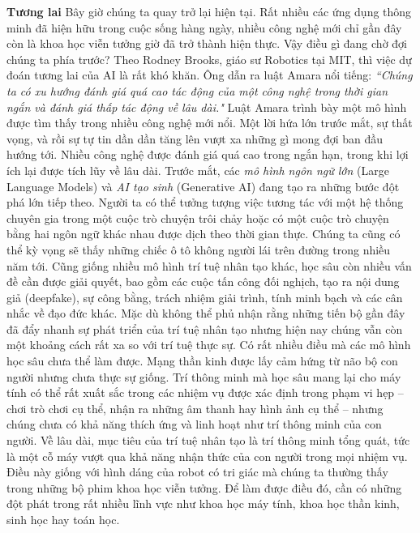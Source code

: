 \begin{multicols}{2}
	\vskip 0.1cm
	\textbf{\color{timhieukhoahoc}Tương lai}
	\vskip 0.1cm
	Bây giờ chúng ta quay trở lại hiện tại. Rất nhiều các ứng dụng thông minh đã hiện hữu trong cuộc sống hàng ngày, nhiều công nghệ mới chỉ gần đây còn là khoa học viễn tưởng giờ đã trở thành hiện thực. Vậy điều gì đang chờ đợi chúng ta phía trước?
	\vskip 0.1cm
	Theo Rodney Brooks, giáo sư Robotics tại MIT, thì việc dự đoán tương lai của AI là rất khó khăn. Ông dẫn ra luật Amara nổi tiếng:
	\textit{``Chúng ta có xu hướng đánh giá quá cao tác động của một công nghệ trong thời gian ngắn và đánh giá thấp tác động về lâu dài."}
	Luật Amara trình bày một mô hình được tìm thấy trong nhiều công nghệ mới nổi. Một lời hứa lớn trước mắt, sự thất vọng, và rồi sự tự tin dần dần tăng lên vượt xa những gì mong đợi ban đầu hướng tới. Nhiều công nghệ được đánh giá quá cao trong ngắn hạn, trong khi lợi ích lại được tích lũy về lâu dài. 
	\vskip 0.1cm
	Trước mắt, các \textit{mô hình ngôn ngữ lớn} (Large Language Models) và \textit{AI tạo sinh} (Generative AI) đang tạo ra những bước đột phá lớn tiếp theo. Người ta có thể tưởng tượng việc tương tác với một hệ thống chuyên gia trong một cuộc trò chuyện trôi chảy hoặc có một cuộc trò chuyện bằng hai ngôn ngữ khác nhau được dịch theo thời gian thực. Chúng ta cũng có thể kỳ vọng sẽ thấy những chiếc ô tô không người lái trên đường trong nhiều năm tới.
	\vskip 0.1cm
	Cũng giống nhiều mô hình trí tuệ nhân tạo khác, học sâu còn nhiều vấn đề cần được giải quyết, bao gồm các cuộc tấn công đối nghịch, tạo ra nội dung giả (deepfake), sự công bằng, trách nhiệm giải trình, tính minh bạch và các cân nhắc về đạo đức khác.
	\vskip 0.1cm
	Mặc dù không thể phủ nhận rằng những tiến bộ gần đây đã đẩy nhanh sự phát triển của trí tuệ nhân tạo nhưng hiện nay chúng vẫn còn một khoảng cách rất xa so với trí tuệ thực sự. Có rất nhiều điều mà các mô hình học sâu chưa thể làm được. Mạng thần kinh được lấy cảm hứng từ não bộ con người nhưng chưa thực sự giống. Trí thông minh mà học sâu mang lại cho máy tính có thể rất xuất sắc trong các nhiệm vụ được xác định trong phạm vi hẹp -- chơi trò chơi cụ thể, nhận ra những âm thanh hay hình ảnh cụ thể  -- nhưng chúng chưa có khả năng thích ứng và linh hoạt như trí thông minh của con người. Về lâu dài, mục tiêu của trí tuệ nhân tạo là trí thông minh tổng quát, tức là một cỗ máy vượt qua khả năng nhận thức của con người trong mọi nhiệm vụ. Điều này giống với hình dáng của robot có tri giác mà chúng ta thường thấy trong những bộ phim khoa học viễn tưởng. Để làm được điều đó, cần có những đột phát trong rất nhiều lĩnh vực như khoa học máy tính, khoa học thần kinh, sinh học hay toán học. 

\end{multicols}
